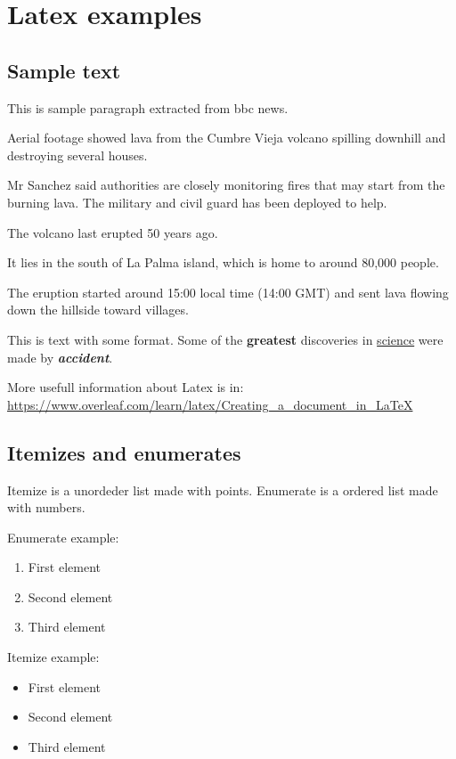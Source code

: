 \chapter{Latex examples}

\section{Sample text}
This is sample paragraph extracted from bbc news.

Aerial footage showed lava from the Cumbre Vieja volcano spilling downhill and destroying several houses.

Mr Sanchez said authorities are closely monitoring fires that may start from the burning lava. The military and civil guard has been deployed to help.

The volcano last erupted 50 years ago.

It lies in the south of La Palma island, which is home to around 80,000 people.

The eruption started around 15:00 local time (14:00 GMT) and sent lava flowing down the hillside toward villages. 

This is text with some format. Some of the \textbf{greatest} discoveries in \underline{science} were made by \textbf{\textit{accident}}.

More usefull information about Latex is in: \url{https://www.overleaf.com/learn/latex/Creating_a_document_in_LaTeX}

\section{Itemizes and enumerates}
Itemize is a unordeder list made with points. Enumerate is a ordered list made with numbers.

Enumerate example:

\begin{enumerate}
\item First element
\item Second element
\item Third element
\end{enumerate}

Itemize example:

\begin{itemize}
  \item First element
  \item Second element
  \item Third element
  \end{itemize}

